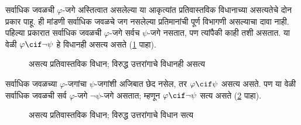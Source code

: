 सर्वाधिक जवळची $\varphi$-जगे अस्तित्वात असलेल्या या
आकृत्यांत प्रतिवास्तविक विधानाच्या असत्यतेचे दोन
प्रकार पाहू. ही मांडणी सर्वाधिक जवळचे जग नसलेल्या
प्रतिमानांची पूर्ण विभागणी असल्याचा दावा नाही.
पहिल्या प्रकारात सर्वाधिक
जवळची $\varphi$-जगे
सर्वच $\psi$-जगे नसतात,
पण त्यांपैकी काही
तशी असतात.
या वेळी $\varphi \cif
\lnot \psi$ हे विधानही
असत्य असते
(\ref{con:min:tf:fig:false} पाहा).
\begin{figure}
\begin{center}
\caption{असत्य प्रतिवास्तविक विधान; विरुद्ध उत्तरांगाचे विधानही असत्य}
\label{con:min:tf:fig:false}
\end{center}
\end{figure}
सर्वाधिक जवळच्या
$\varphi$-जगांचा
$\psi$-जगांशी
अजिबात छेद नसेल,
तर $\varphi \cif \psi$
असत्य असते. पण
या वेळी सर्वाधिक
जवळची सर्व
$\varphi$-जगे
$\lnot \psi$-जगे
असतात; म्हणून
$\varphi \cif \lnot \psi$
सत्य असते
(\ref{con:min:tf:fig:false-opposite} पाहा).
\begin{figure}
\begin{center}
\caption{असत्य प्रतिवास्तविक विधान; विरुद्ध उत्तरांगाचे विधान सत्य}
\label{con:min:tf:fig:false-opposite}
\end{center}
\end{figure}

